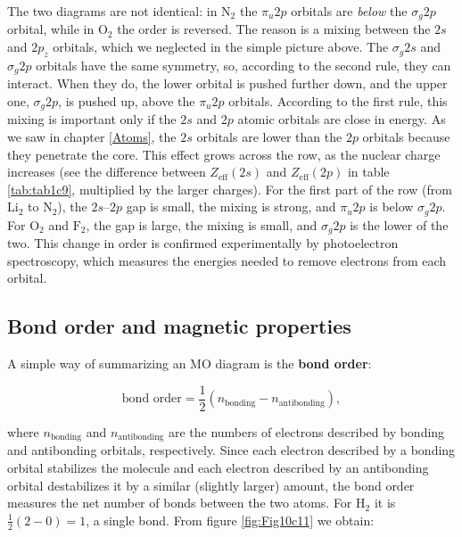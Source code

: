 \documentclass[
  english,
  9pt,
]{extbook}
\theoremstyle{definition}
\theoremstyle{definition}
\theoremstyle{definition}
\theoremstyle{definition}
\theoremstyle{remark}
\begin{document}
The two diagrams are not identical: in \(\mathrm{N}_2\) the \(\pi_u 2p\) orbitals are \emph{below} the \(\sigma_g 2p\) orbital, while in \(\mathrm{O}_2\) the order is reversed. The reason is a mixing between the \(2s\) and \(2p_z\) orbitals, which we neglected in the simple picture above. The \(\sigma_g 2s\) and \(\sigma_g 2p\) orbitals have the same symmetry, so, according to the second rule, they can interact. When they do, the lower orbital is pushed further down, and the upper one, \(\sigma_g 2p\), is pushed up, above the \(\pi_u 2p\) orbitals. According to the first rule, this mixing is important only if the \(2s\) and \(2p\) atomic orbitals are close in energy. As we saw in chapter \ref{Atoms}, the \(2s\) orbitals are lower than the \(2p\) orbitals because they penetrate the core. This effect grows across the row, as the nuclear charge increases (see the difference between \(Z_\text{eff}(2s)\) and \(Z_\text{eff}(2p)\) in table \ref{tab:tab1c9}, multiplied by the larger charges). For the first part of the row (from \(\mathrm{Li}_2\) to \(\mathrm{N}_2\)), the \(2s\)--\(2p\) gap is small, the mixing is strong, and \(\pi_u 2p\) is below \(\sigma_g 2p\). For \(\mathrm{O}_2\) and \(\mathrm{F}_2\), the gap is large, the mixing is small, and \(\sigma_g 2p\) is the lower of the two. This change in order is confirmed experimentally by photoelectron spectroscopy, which measures the energies needed to remove electrons from each orbital.

\subsection{Bond order and magnetic properties}\label{bond-order-and-magnetic-properties}

A simple way of summarizing an MO diagram is the \textbf{bond order}:

\begin{equation}
\text{bond order} = \frac{1}{2}\left(n_\text{bonding} - n_\text{antibonding}\right),
\label{eq:bondorder}
\end{equation}

where \(n_\text{bonding}\) and \(n_\text{antibonding}\) are the numbers of electrons described by bonding and antibonding orbitals, respectively. Since each electron described by a bonding orbital stabilizes the molecule and each electron described by an antibonding orbital destabilizes it by a similar (slightly larger) amount, the bond order measures the net number of bonds between the two atoms. For \(\mathrm{H}_2\) it is \(\frac{1}{2}(2-0)=1\), a single bond. From figure \ref{fig:Fig10c11} we obtain:
\end{document}

